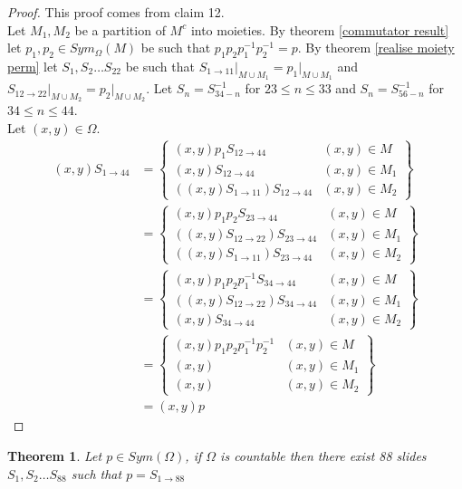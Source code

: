 \documentclass{report}
\newtheorem{theorem}{Theorem}[section]
\begin{document}
\begin{proof}
This proof comes from \cite{shuffle1} claim 12.\\
 Let \(M_1,M_2\) be a partition of \(M^c\) into moieties. By theorem \ref{commutator result} let \(p_1,p_2\in Sym_{\Omega}(M)\) be such that \(p_1p_2p_1^{-1}p_2^{-1}=p\). By theorem \ref{realise moiety perm} let \(S_1,S_2 \ldots S_{22}\) be such that \(S_{1\rightarrow 11}\vert_{M\cup M_1}=p_1\vert_{M\cup M_1}\) and \(S_{12\rightarrow 22}\vert_{M\cup M_2}=p_2\vert_{M\cup M_2}\). Let \(S_n=S_{34-n}^{-1}\) for \(23 \leq n \leq 33\) and \(S_n=S_{56-n}^{-1}\) for \(34 \leq n \leq 44\).\\
Let \((x,y)\in \Omega\).
\begin{align*}
(x,y)S_{1\rightarrow 44}&=\left\{
	\begin{array}{lr}
	(x,y)p_1S_{12\rightarrow 44}& (x,y)\in M\\
	(x,y)S_{12\rightarrow 44}& (x,y)\in M_1\\
	((x,y)S_{1\rightarrow 11})S_{12\rightarrow 44}& (x,y)\in M_2
	\end{array}
	\right\}\\
&=\left\{
	\begin{array}{lr}
	(x,y)p_1p_2S_{23\rightarrow 44}& (x,y)\in M\\
	((x,y)S_{12\rightarrow 22})S_{23\rightarrow 44}& (x,y)\in M_1\\
	((x,y)S_{1\rightarrow 11})S_{23\rightarrow 44}& (x,y)\in M_2
	\end{array}
	\right\}\\
	&=\left\{
	\begin{array}{lr}
	(x,y)p_1p_2p_1^{-1}S_{34\rightarrow 44}& (x,y)\in M\\
	((x,y)S_{12\rightarrow 22})S_{34\rightarrow 44}& (x,y)\in M_1\\
	(x,y)S_{34\rightarrow 44}& (x,y)\in M_2
	\end{array}
	\right\}\\
		&=\left\{
	\begin{array}{lr}
	(x,y)p_1p_2p_1^{-1}p_2^{-1}& (x,y)\in M\\
	(x,y) & (x,y)\in M_1\\
	(x,y)& (x,y)\in M_2
	\end{array}
	\right\}\\
&=(x,y)p
\end{align*}
\end{proof}
\begin{theorem}
Let \(p \in Sym(\Omega)\), if \(\Omega\) is countable then there exist 88 slides \(S_1,S_2\ldots S_{88}\) such that \(p=S_{1\rightarrow 88}\)
\end{theorem}
\end{document}
